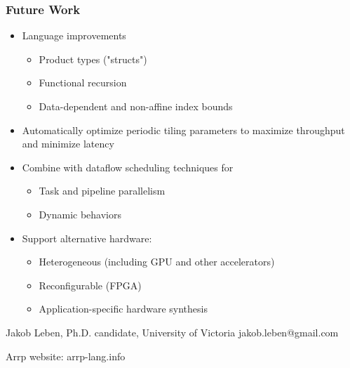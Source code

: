 \documentclass{beamer}
\begin{document}
\begin{frame}
\frametitle{Future Work}

\begin{itemize}
  \item Language improvements
      \begin{itemize}
      \item Product types ("structs")
      \item Functional recursion
      \item Data-dependent and non-affine index bounds
      \end{itemize}
  \item Automatically optimize periodic tiling parameters to maximize throughput and minimize latency
  \item Combine with dataflow scheduling techniques for
      \begin{itemize}
      \item Task and pipeline parallelism
      \item Dynamic behaviors
      \end{itemize}
  \item Support alternative hardware:
      \begin{itemize}
      \item Heterogeneous (including GPU and other accelerators)
      \item Reconfigurable (FPGA)
      \item Application-specific hardware synthesis
      \end{itemize}
\end{itemize}

\end{frame}

\begin{frame}

\centering

Jakob Leben, Ph.D. candidate, University of Victoria
jakob.leben@gmail.com

\vspace{3em}
Arrp website: arrp-lang.info
\end{frame}
\end{document}
